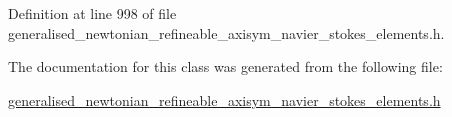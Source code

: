Definition at line 998 of file generalised\+\_\+newtonian\+\_\+refineable\+\_\+axisym\+\_\+navier\+\_\+stokes\+\_\+elements.\+h.



The documentation for this class was generated from the following file\+:\begin{DoxyCompactItemize}
\item 
\hyperlink{generalised__newtonian__refineable__axisym__navier__stokes__elements_8h}{generalised\+\_\+newtonian\+\_\+refineable\+\_\+axisym\+\_\+navier\+\_\+stokes\+\_\+elements.\+h}\end{DoxyCompactItemize}
